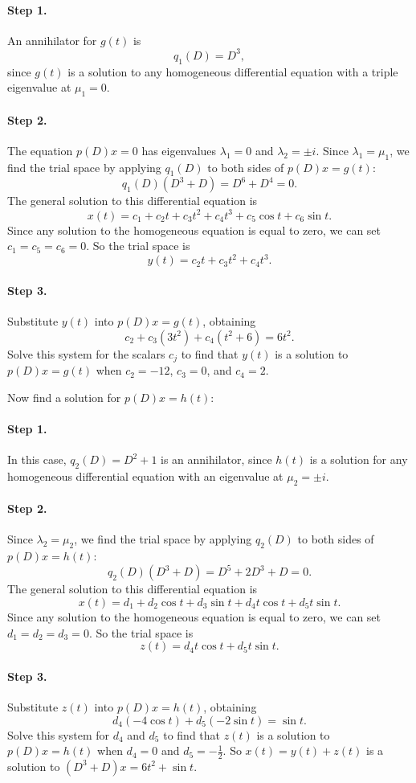 \paragraph{Step 1.} An annihilator for $g(t)$ is
\[
q_1(D) = D^3,
\]
since $g(t)$ is a solution to any homogeneous differential equation
with a triple eigenvalue at $\mu_1 = 0$.

\paragraph{Step 2.} The equation $p(D)x = 0$ has eigenvalues
$\lambda_1 = 0$ and $\lambda_2 = \pm i$.  Since $\lambda_1 = \mu_1$,
we find the trial space by applying $q_1(D)$ to both sides of $p(D)x =
g(t)$:
\[
q_1(D)(D^3 + D) = D^6 + D^4 = 0.
\]
The general solution to this differential equation is
\[
x(t) = c_1 + c_2t + c_3t^2 + c_4t^3 + c_5\cos t + c_6\sin t.
\]
Since any solution to the homogeneous equation is equal to zero, we can
set $c_1 = c_5 = c_6 = 0$.  So the trial space is
\[
y(t) = c_2t + c_3t^2 + c_4t^3.
\]
\paragraph{Step 3.} Substitute $y(t)$ into $p(D)x = g(t)$, obtaining
\[
c_2 + c_3(3t^2) + c_4(t^2 + 6) = 6t^2.
\]
Solve this system for the scalars $c_j$ to find that $y(t)$ is a solution
to $p(D)x = g(t)$ when $c_2 = -12$, $c_3 = 0$, and $c_4 = 2$.

\para Now find a solution for $p(D)x = h(t)$:

\paragraph{Step 1.} In this case, $q_2(D) = D^2 + 1$ is an annihilator,
since $h(t)$ is a solution for any homogeneous differential equation
with an eigenvalue at $\mu_2 = \pm i$.

\paragraph{Step 2.} Since $\lambda_2 = \mu_2$, we find the trial space
by applying $q_2(D)$ to both sides of $p(D)x = h(t)$:
\[
q_2(D)(D^3 + D) = D^5 + 2D^3 + D = 0.
\]
The general solution to this differential equation is
\[
x(t) = d_1 + d_2\cos t + d_3\sin t + d_4t\cos t + d_5t\sin t.
\]
Since any solution to the homogeneous equation is equal to zero, we can
set $d_1 = d_2 = d_3 = 0$.  So the trial space is
\[
z(t) = d_4t\cos t + d_5t\sin t.
\]
\paragraph{Step 3.} Substitute $z(t)$ into $p(D)x = h(t)$, obtaining
\[
d_4(-4\cos t) + d_5(-2\sin t) = \sin t.
\]
Solve this system for $d_4$ and $d_5$ to find that $z(t)$ is a solution
to $p(D)x = h(t)$ when $d_4 = 0$ and $d_5 = -\frac{1}{2}$.  So $x(t) =
y(t) + z(t)$ is a solution to $(D^3 + D)x = 6t^2 + \sin t$.

